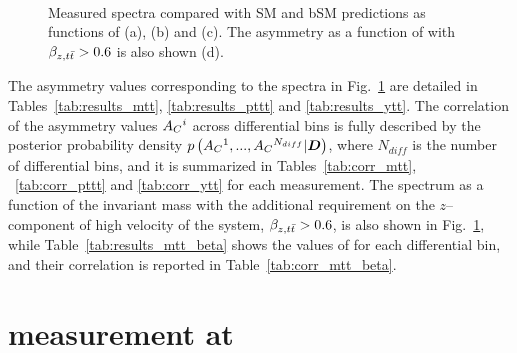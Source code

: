 \begin{figure}[!htb]\centering
   \quad
   \\
   \quad
  \caption{Measured \ac{} spectra compared with SM and bSM predictions
    as functions of \mtt{} (a), \pttt{} (b) and \ytt{} (c). The
    asymmetry as a function of \mtt{} with $\mbox{$\beta_{z,t\bar{t}}$}{}>0.6$ is also
    shown (d).}
  \label{fig:unfac_diff}
\end{figure}

The asymmetry values corresponding to the spectra in
Fig.~\ref{fig:unfac_diff} are detailed in Tables~\ref{tab:results_mtt},
\ref{tab:results_pttt} and \ref{tab:results_ytt}.
The correlation of the asymmetry values $\mbox{$A_C$}{}^i$ across differential bins is
fully described by the posterior probability density
$p\left(\mbox{$A_C$}{}^1,...,\mbox{$A_C$}{}^{N_{diff}}|\boldsymbol{D}{}\right)$, where
$N_{diff}$ is the number of differential bins, and it is summarized in
Tables~\ref{tab:corr_mtt}, ~\ref{tab:corr_pttt} and 
\ref{tab:corr_ytt} for each measurement.
The \ac{} spectrum as a function of the \ttbar{} invariant mass \mtt{}
with the additional requirement on the $z$--component of high velocity
of the \ttbar{} system, $\mbox{$\beta_{z,t\bar{t}}$}{}>0.6$, is also shown in
Fig.~\ref{fig:unfac_diff}, while Table~\ref{tab:results_mtt_beta}
shows the values of \ac{} for each differential bin, and their
correlation is reported in Table~\ref{tab:corr_mtt_beta}.



\section{\ac{} measurement at \eighttev{}}
\label{sec:res8tev}

